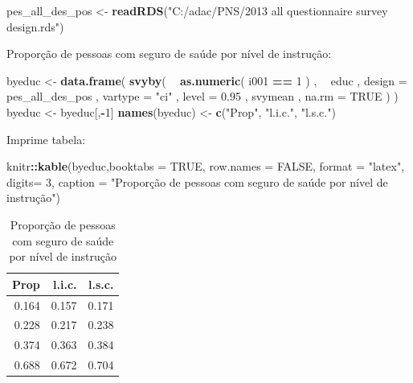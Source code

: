 \documentclass[]{book}
\newenvironment{Shaded}{\begin{snugshade}}{\end{snugshade}}
\newcommand{\KeywordTok}[1]{\textcolor[rgb]{0.13,0.29,0.53}{\textbf{#1}}}
\newcommand{\DataTypeTok}[1]{\textcolor[rgb]{0.13,0.29,0.53}{#1}}
\newcommand{\DecValTok}[1]{\textcolor[rgb]{0.00,0.00,0.81}{#1}}
\newcommand{\FloatTok}[1]{\textcolor[rgb]{0.00,0.00,0.81}{#1}}
\newcommand{\StringTok}[1]{\textcolor[rgb]{0.31,0.60,0.02}{#1}}
\newcommand{\OtherTok}[1]{\textcolor[rgb]{0.56,0.35,0.01}{#1}}
\newcommand{\OperatorTok}[1]{\textcolor[rgb]{0.81,0.36,0.00}{\textbf{#1}}}
\newcommand{\NormalTok}[1]{#1}
\theoremstyle{definition}
\theoremstyle{definition}
\theoremstyle{definition}
\theoremstyle{remark}
\begin{document}
\begin{Shaded}
\begin{Highlighting}[]
\NormalTok{pes_all_des_pos <-}\StringTok{ }\KeywordTok{readRDS}\NormalTok{(}\StringTok{"C:/adac/PNS/2013 all questionnaire survey design.rds"}\NormalTok{)}
\end{Highlighting}
\end{Shaded}

Proporção de pessoas com seguro de saúde por nível de instrução:

\begin{Shaded}
\begin{Highlighting}[]
\NormalTok{byeduc <-}\StringTok{ }\KeywordTok{data.frame}\NormalTok{( }\KeywordTok{svyby}\NormalTok{( }\OperatorTok{~}\StringTok{ }\KeywordTok{as.numeric}\NormalTok{( i001 }\OperatorTok{==}\StringTok{ }\DecValTok{1}\NormalTok{ ) , }\OperatorTok{~}\StringTok{ }\NormalTok{educ ,}
\DataTypeTok{design =}\NormalTok{ pes_all_des_pos , }\DataTypeTok{vartype =} \StringTok{"ci"}\NormalTok{ ,  }\DataTypeTok{level =} \FloatTok{0.95}\NormalTok{ ,}
\NormalTok{svymean , }\DataTypeTok{na.rm =} \OtherTok{TRUE}\NormalTok{ ) )}
\NormalTok{byeduc <-}\StringTok{ }\NormalTok{byeduc[,}\OperatorTok{-}\DecValTok{1}\NormalTok{]}
\KeywordTok{names}\NormalTok{(byeduc) <-}\StringTok{ }\KeywordTok{c}\NormalTok{(}\StringTok{"Prop"}\NormalTok{, }\StringTok{"l.i.c."}\NormalTok{, }\StringTok{"l.s.c."}\NormalTok{)}
\end{Highlighting}
\end{Shaded}

Imprime tabela:

\begin{Shaded}
\begin{Highlighting}[]
\NormalTok{knitr}\OperatorTok{::}\KeywordTok{kable}\NormalTok{(byeduc,}\DataTypeTok{booktabs =} \OtherTok{TRUE}\NormalTok{, }\DataTypeTok{row.names =} \OtherTok{FALSE}\NormalTok{, }\DataTypeTok{format =} \StringTok{"latex"}\NormalTok{, }
\DataTypeTok{digits=} \DecValTok{3}\NormalTok{, }\DataTypeTok{caption =} \StringTok{"Proporção de pessoas com seguro de saúde por nível }
\StringTok{de instrução"}\NormalTok{)}
\end{Highlighting}
\end{Shaded}

\begin{table}

\caption{\label{tab:unnamed-chunk-55}Proporção de pessoas com seguro de saúde por nível 
de instrução}
\centering
\begin{tabular}[t]{rrr}
\toprule
Prop & l.i.c. & l.s.c.\\
\midrule
0.164 & 0.157 & 0.171\\
0.228 & 0.217 & 0.238\\
0.374 & 0.363 & 0.384\\
0.688 & 0.672 & 0.704\\
\bottomrule
\end{tabular}
\end{table}
\end{document}
